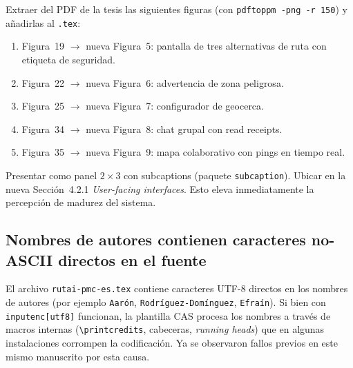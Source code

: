 \documentclass[11pt,a4paper]{article}
\begin{document}
\begin{abordaje}
Extraer del PDF de la tesis las siguientes figuras (con \texttt{pdftoppm -png -r 150}) y a\~nadirlas al \texttt{.tex}:

\begin{enumerate}
  \item Figura~19 $\to$ nueva Figura~5: pantalla de tres alternativas de ruta con etiqueta de seguridad.
  \item Figura~22 $\to$ nueva Figura~6: advertencia de zona peligrosa.
  \item Figura~25 $\to$ nueva Figura~7: configurador de geocerca.
  \item Figura~34 $\to$ nueva Figura~8: chat grupal con read receipts.
  \item Figura~35 $\to$ nueva Figura~9: mapa colaborativo con pings en tiempo real.
\end{enumerate}

Presentar como panel $2\times 3$ con subcaptions (paquete \texttt{subcaption}). Ubicar en la nueva Secci\'on~4.2.1 \emph{User-facing interfaces}. Esto eleva inmediatamente la percepci\'on de madurez del sistema.
\end{abordaje}

\subsection{Nombres de autores contienen caracteres no-ASCII directos en el fuente}

\begin{deficiencia}[M.2 --- Deficiencia]
El archivo \texttt{rutai-pmc-es.tex} contiene caracteres UTF-8 directos en los nombres de autores (por ejemplo \texttt{Aar\'on}, \texttt{Rodr\'iguez-Dom\'inguez}, \texttt{Efra\'in}). Si bien con \texttt{inputenc[utf8]} funcionan, la plantilla CAS procesa los nombres a trav\'es de macros internas (\texttt{\textbackslash printcredits}, cabeceras, \emph{running heads}) que en algunas instalaciones corrompen la codificaci\'on. Ya se observaron fallos previos en este mismo manuscrito por esta causa.
\end{deficiencia}
\end{document}
